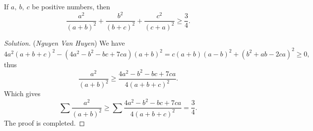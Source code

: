 \documentclass[12pt,a4paper]{book}
\begin{document}
\begin{pro}
If $a, \ b, \ c$ be positive numbers, then
\[\frac{a^2}{(a+b)^2}+\frac{b^2}{(b+c)^2}+\frac{c^2}{(c+a)^2} \geqslant \frac{3}{4}.\]
\end{pro}

\begin{proof}[\cmss\problemColor Solution] (\textit{Nguyen Van Huyen})
We have
\[4a^2(a + b + c)^2 - (4a^2 - b^2 - bc + 7ca)(a + b)^2 = c(a+b)(a-b)^2 + (b^2+ab-2ca)^2 \ge 0,\]
thus
\[\frac{a^2}{(a+b)^2} \geqslant \frac{4a^2-b^2-bc+7ca}{4(a+b+c)^2}.\]
Which gives
\[\sum\frac{a^2}{(a+b)^2} \geqslant \sum\frac{4a^2-b^2-bc+7ca}{4(a+b+c)^2} = \frac{3}{4}.\]
The proof is completed.
\end{proof}
\end{document}
